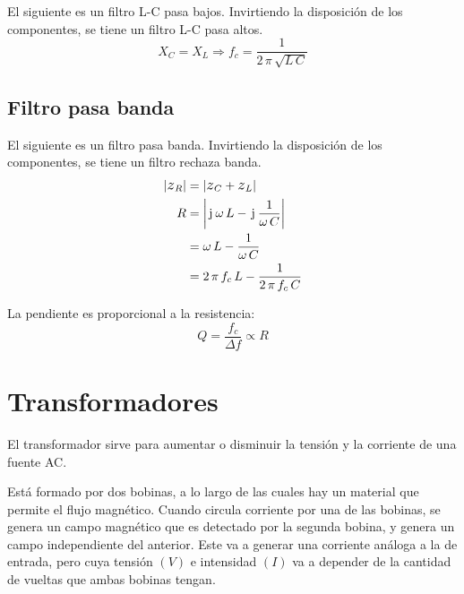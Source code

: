 \documentclass[a5paper,12pt,twoside]{book}
\begin{document}
El siguiente es un filtro L-C pasa bajos. Invirtiendo la disposición de los componentes, se tiene un filtro L-C pasa altos.
\begin{equation*}
    X_C = X_L \Rightarrow f_c = \dfrac{1}{2 \, \pi \, \sqrt{L \, C}}
\end{equation*}

\begin{center}
    \def\svgwidth{0.6\linewidth}
    
\end{center}


\subsection{Filtro pasa banda}

El siguiente es un filtro pasa banda. Invirtiendo la disposición de los componentes, se tiene un filtro rechaza banda.
\begin{align*}
    \norm{\impedance_R} &= \norm{\impedance_C + \impedance_L}
    \\
    R &= \norm{\iu \, \omega \, L - \iu \, \frac{1}{\omega \, C}}
    \\
    &= \omega \, L - \frac{1}{\omega \, C}
    \\
    &= 2 \, \pi \, f_c \, L - \frac{1}{2 \, \pi \, f_c \, C}
\end{align*}

\begin{center}
    \def\svgwidth{0.6\linewidth}
    
\end{center}

La pendiente es proporcional a la resistencia:
\begin{equation*}
    Q = \frac{f_c}{\Delta f} \propto R
\end{equation*}


\section{Transformadores}

El transformador sirve para aumentar o disminuir la tensión y la corriente de una fuente AC.

Está formado por dos bobinas, a lo largo de las cuales hay un material que permite el flujo magnético. Cuando circula corriente por una de las bobinas, se genera un campo magnético que es detectado por la segunda bobina, y genera un campo independiente del anterior. Este va a generar una corriente análoga a la de entrada, pero cuya tensión $(V)$ e intensidad $(I)$ va a depender de la cantidad de vueltas que ambas bobinas tengan.
\end{document}
